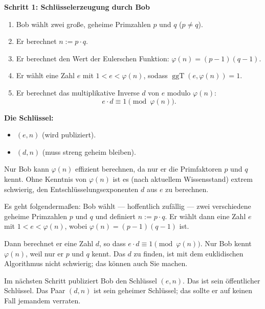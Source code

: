 \begin{math-stroke}
\textbf{Schritt 1: Schlüsselerzeugung durch Bob}
\begin{enumerate}[label=\textbf{\arabic*.}]
    \item Bob wählt zwei große, geheime Primzahlen $p$ und $q$ ($p \neq q$).
    \item Er berechnet $n := p \cdot q$.
    \item Er berechnet den Wert der Eulerschen Funktion: $\varphi(n) = (p-1)(q-1)$.
    \item Er wählt eine Zahl $e$ mit $1 < e < \varphi(n)$, sodass $\operatorname{ggT}(e, \varphi(n)) = 1$.
    \item Er berechnet das multiplikative Inverse $d$ von $e$ modulo $\varphi(n)$:
    \begin{equation}\label{eq:rsa-d}
    e \cdot d \equiv 1 \pmod{\varphi(n)}.
    \end{equation}
\end{enumerate}

\textbf{Die Schlüssel:}
\begin{itemize}
    \item {} $(e, n)$ (wird publiziert).
    \item {} $(d, n)$ (muss streng geheim bleiben).
\end{itemize}

\begin{explanation-of-steps}
Nur Bob kann $\varphi(n)$ effizient berechnen, da nur er die Primfaktoren $p$ und $q$ kennt. Ohne Kenntnis von $\varphi(n)$ ist es (nach aktuellem Wissensstand) extrem schwierig, den Entschlüsselungsexponenten $d$ aus $e$ zu berechnen.
\end{explanation-of-steps}
\end{math-stroke}

\begin{spoken-clean}[01:23:24 - 01:25:54]
Es geht folgendermaßen: Bob wählt --- hoffentlich zufällig --- zwei verschiedene geheime Primzahlen $p$ und $q$ und definiert $n := p \cdot q$. Er wählt dann eine Zahl $e$ mit $1 < e < \varphi(n)$, wobei $\varphi(n) = (p - 1)(q - 1)$ ist.

Dann berechnet er eine Zahl $d$, so dass $e \cdot d \equiv 1 \pmod{\varphi(n)}$. Nur Bob kennt $\varphi(n)$, weil nur er $p$ und $q$ kennt. Das $d$ zu finden, ist mit dem euklidischen Algorithmus nicht schwierig; das können auch Sie machen.

Im nächsten Schritt publiziert Bob den Schlüssel $(e, n)$. Das ist sein öffentlicher Schlüssel. Das Paar $(d, n)$ ist sein geheimer Schlüssel; das sollte er auf keinen Fall jemandem verraten.
\end{spoken-clean}

